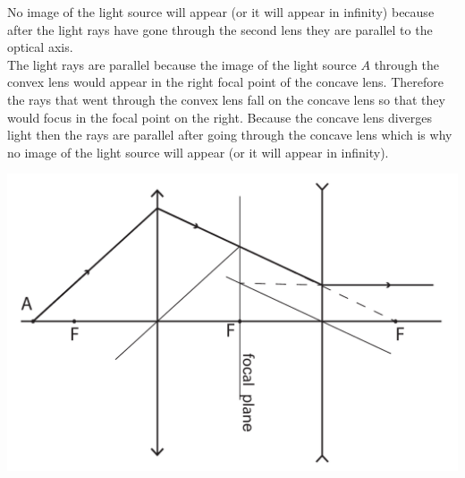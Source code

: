 {\ifEngSolution
No image of the light source will appear (or it will appear in infinity) because after the light rays have gone through the second lens they are parallel to the optical axis.\\
The light rays are parallel because the image of the light source $A$ through the convex lens would appear in the right focal point of the concave lens. Therefore the rays that went through the convex lens fall on the concave lens so that they would focus in the focal point on the right. Because the concave lens diverges light then the rays are parallel after going through the concave lens which is why no image of the light source will appear (or it will appear in infinity).
\begin{center}
	\includegraphics[width=0.7\linewidth]{2017-lahg-02-valgusallikaslah_ing}
\end{center}
\fi
}